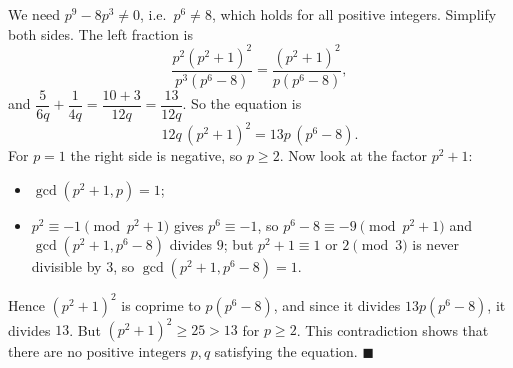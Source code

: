 We need $p^9-8p^3\ne0$, i.e.\ $p^6\ne8$, which holds for all positive integers. Simplify both sides. The left fraction is
\[
\dfrac{p^2(p^2+1)^2}{p^3(p^6-8)}=\dfrac{(p^2+1)^2}{p(p^6-8)},
\]
and $\dfrac{5}{6q}+\dfrac{1}{4q}=\dfrac{10+3}{12q}=\dfrac{13}{12q}$. So the equation is
\[
12q\,(p^2+1)^2=13p\,(p^6-8).
\]
For $p=1$ the right side is negative, so $p\ge2$. Now look at the factor $p^2+1$:
\begin{itemize}
\item $\gcd(p^2+1,p)=1$;
\item $p^2\equiv-1\pmod{p^2+1}$ gives $p^6\equiv-1$, so $p^6-8\equiv-9\pmod{p^2+1}$ and $\gcd(p^2+1,p^6-8)$ divides $9$; but $p^2+1\equiv1$ or $2\pmod3$ is never divisible by $3$, so $\gcd(p^2+1,p^6-8)=1$.
\end{itemize}
Hence $(p^2+1)^2$ is coprime to $p(p^6-8)$, and since it divides $13p(p^6-8)$, it divides $13$. But $(p^2+1)^2\ge25>13$ for $p\ge2$. This contradiction shows that there are $\boxed{\text{no positive integers }p,q}$ satisfying the equation. $\blacksquare$
